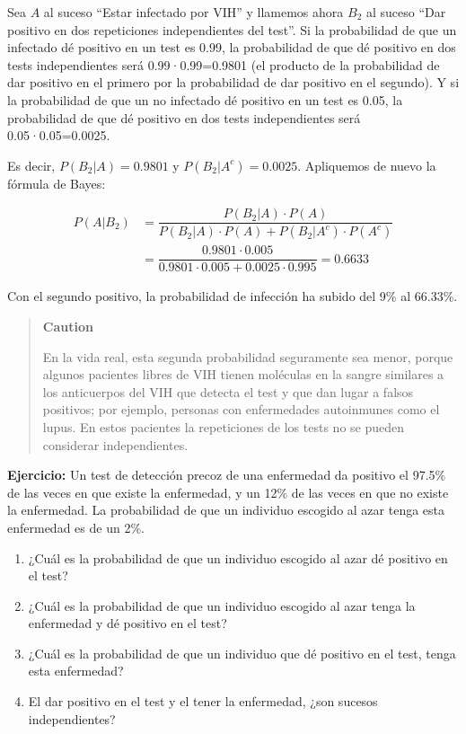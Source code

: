 \documentclass[
  spanish,
  letterpaper,
  DIV=11,
  numbers=noendperiod]{scrreprt}
\begin{document}
\begin{tcolorbox}
Sea \(A\) al suceso ``Estar infectado por VIH'' y llamemos ahora \(B_2\)
al suceso ``Dar positivo en dos repeticiones independientes del test''.
Si la probabilidad de que un infectado dé positivo en un test es 0.99,
la probabilidad de que dé positivo en dos tests independientes será
0.99·0.99=0.9801 (el producto de la probabilidad de dar positivo en el
primero por la probabilidad de dar positivo en el segundo). Y si la
probabilidad de que un no infectado dé positivo en un test es 0.05, la
probabilidad de que dé positivo en dos tests independientes será
0.05·0.05=0.0025.

Es decir, \(P(B_2|A)=0.9801\) y \(P(B_2|A^c)=0.0025\). Apliquemos de
nuevo la fórmula de Bayes:

\[
\begin{array}{rl}
P(A|B_2)\!\!\!\! & =\dfrac{P(B_2|A)\cdot P(A)}{P(B_2|A)\cdot P(A)+P(B_2|A^c)\cdot P(A^c)}\\
&=\dfrac{0.9801\cdot 0.005}{0.9801\cdot 0.005+0.0025\cdot 0.995}=0.6633
\end{array}
\]

Con el segundo positivo, la probabilidad de infección ha subido del 9\%
al 66.33\%.

\begin{quote}
\textbf{Caution}

En la vida real, esta segunda probabilidad seguramente sea menor, porque
algunos pacientes libres de VIH tienen moléculas en la sangre similares
a los anticuerpos del VIH que detecta el test y que dan lugar a falsos
positivos; por ejemplo, personas con enfermedades autoinmunes como el
lupus. En estos pacientes la repeticiones de los tests no se pueden
considerar independientes.
\end{quote}

\textbf{Ejercicio:} Un test de detección precoz de una enfermedad da
positivo el 97.5\% de las veces en que existe la enfermedad, y un 12\%
de las veces en que no existe la enfermedad. La probabilidad de que un
individuo escogido al azar tenga esta enfermedad es de un 2\%.

\begin{enumerate}
\def\labelenumi{\alph{enumi}.}
\item
  ¿Cuál es la probabilidad de que un individuo escogido al azar dé
  positivo en el test?
\item
  ¿Cuál es la probabilidad de que un individuo escogido al azar tenga la
  enfermedad y dé positivo en el test?
\item
  ¿Cuál es la probabilidad de que un individuo que dé positivo en el
  test, tenga esta enfermedad?
\item
  El dar positivo en el test y el tener la enfermedad, ¿son sucesos
  independientes?
\end{enumerate}


\end{tcolorbox}
\end{document}
